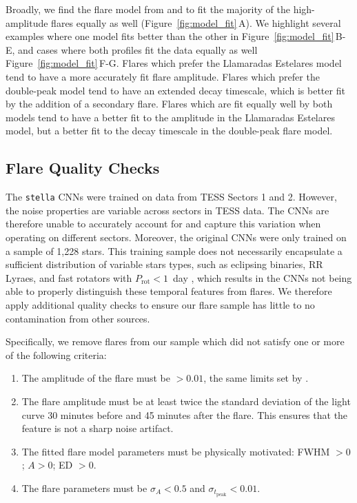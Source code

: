 \documentclass[twocolumn]{aastex631}
\begin{document}
Broadly, we find the flare model from \cite{tovar22} and \cite{pietras22}
to fit the majority of the high-amplitude flares equally as well (Figure~\ref{fig:model_fit}\,A).
We highlight several examples where one model fits better than the other in Figure~\ref{fig:model_fit}\,B-E,
and cases where both profiles fit the data equally as well Figure~\ref{fig:model_fit}\,F-G.
Flares which prefer the Llamaradas Estelares model tend to have a more accurately fit flare
amplitude. Flares which prefer the double-peak model tend to have an extended decay timescale,
which is better fit by the addition of a secondary flare. Flares which are fit equally well by
both models tend to have a better fit to the amplitude in the Llamaradas Estelares model, but a
better fit to the decay timescale in the double-peak flare model.


\subsection{Flare Quality Checks}\label{subsec2:qualitychecks}

The \texttt{stella} CNNs were trained on data from TESS Sectors 1 and 2. However, the
noise properties are variable across sectors in TESS data. The CNNs are therefore unable
to accurately account for and capture  this variation when operating on different sectors.
Moreover, the original CNNs were only trained on a sample of 1,228 stars. This training
sample does not necessarily encapsulate a sufficient distribution  of variable stars types,
such as eclipsing binaries, RR Lyraes, and fast rotators with $P_\textrm{rot} < 1$~day
\citep{lawson19}, which results in the CNNs not being able to properly distinguish these
temporal features from flares. We therefore apply additional quality checks to ensure our
flare sample has little to no contamination from other sources.

Specifically, we remove flares from our sample which did not satisfy  one or more of the following criteria:
\begin{enumerate}
    \item  The amplitude of the flare must be $> 0.01$, the same limits set by \cite{feinstein20}.
    \item The flare amplitude  must be at least twice the standard deviation of the light curve
    30 minutes before and 45 minutes after the flare. This ensures that the feature is not a sharp noise artifact.
    \item  The fitted flare model parameters must be physically motivated: FWHM $> 0$; $A > 0$; ED $> 0$.
    \item The flare parameters must be $\sigma_A < 0.5$ and $\sigma_{t_\textrm{peak}} < 0.01$.
\end{enumerate}
\end{document}
